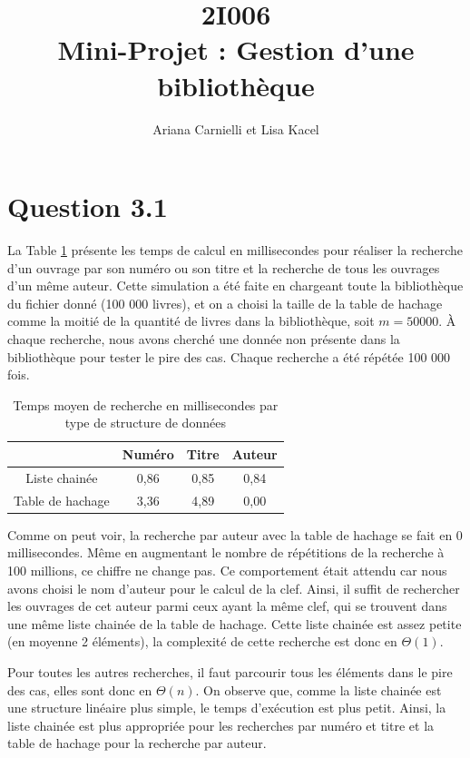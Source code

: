 \documentclass[a4paper,12pt]{article}
\numberwithin{equation}{section}
\begin{document}
\title{2I006 \\ Mini-Projet : Gestion d'une bibliothèque}
\author{Ariana Carnielli et Lisa Kacel}
\date{}

\maketitle

\section*{Question 3.1}

La Table \ref{TabQues31} présente les temps de calcul en millisecondes pour réaliser la recherche d'un ouvrage par son numéro ou son titre et la recherche de tous les ouvrages d'un même auteur. Cette simulation a été faite en chargeant toute la bibliothèque du fichier donné (100 000 livres), et on a choisi la taille de la table de hachage comme la moitié de la quantité de livres dans la bibliothèque, soit $m = 50 000$. À chaque recherche, nous avons cherché une donnée non présente dans la bibliothèque pour tester le pire des cas. Chaque recherche a été répétée 100 000 fois.

\begin{table}[ht]
\centering
\begin{tabular}{c|ccc}
\hline\hline
& Numéro & Titre & Auteur \tabularnewline
\hline
Liste chainée & 0,86 & 0,85 & 0,84 \tabularnewline
Table de hachage & 3,36 & 4,89 & 0,00 \tabularnewline
\hline\hline
\end{tabular}
\caption{Temps moyen de recherche en millisecondes par type de structure de données}
\label{TabQues31}
\end{table}

Comme on peut voir, la recherche par auteur avec la table de hachage se fait en 0 millisecondes. Même en augmentant le nombre de répétitions de la recherche à 100 millions, ce chiffre ne change pas. Ce comportement était attendu car nous avons choisi le nom d'auteur pour le calcul de la clef. Ainsi, il suffit de rechercher les ouvrages de cet auteur parmi ceux ayant la même clef, qui se trouvent dans une même liste chainée de la table de hachage. Cette liste chainée est assez petite (en moyenne 2 éléments), la complexité de cette recherche est donc en $\Theta(1)$.

Pour toutes les autres recherches, il faut parcourir tous les éléments dans le pire des cas, elles sont donc en $\Theta(n)$. On observe que, comme la liste chainée est une structure linéaire plus simple, le temps d'exécution est plus petit. Ainsi, la liste chainée est plus appropriée pour les recherches par numéro et titre et la table de hachage pour la recherche par auteur.
\end{document}

